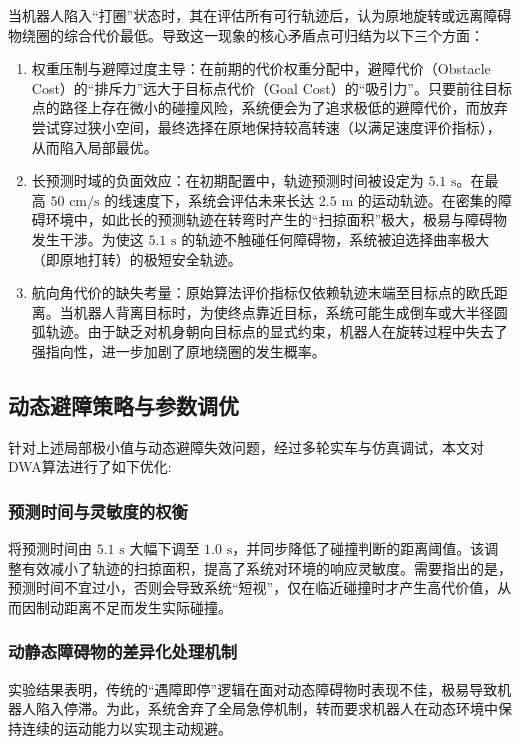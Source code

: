 \documentclass[
  oneside,
  degree=bachelor,
  fullwidthstop=false,
  fontset=fandol,
  times=false,
  minted=true,
  biblatex=true,
]{tongjithesis}
\begin{document}
当机器人陷入“打圈”状态时，其在评估所有可行轨迹后，认为原地旋转或远离障碍物绕圈的综合代价最低。导致这一现象的核心矛盾点可归结为以下三个方面：

\begin{enumerate}
    \item 权重压制与避障过度主导：在前期的代价权重分配中，避障代价（Obstacle Cost）的“排斥力”远大于目标点代价（Goal Cost）的“吸引力”。只要前往目标点的路径上存在微小的碰撞风险，系统便会为了追求极低的避障代价，而放弃尝试穿过狭小空间，最终选择在原地保持较高转速（以满足速度评价指标），从而陷入局部最优。
    
    \item 长预测时域的负面效应：在初期配置中，轨迹预测时间被设定为 $5.1\text{ s}$。在最高 $50\text{ cm/s}$ 的线速度下，系统会评估未来长达 $2.5\text{ m}$ 的运动轨迹。在密集的障碍环境中，如此长的预测轨迹在转弯时产生的“扫掠面积”极大，极易与障碍物发生干涉。为使这 $5.1\text{ s}$ 的轨迹不触碰任何障碍物，系统被迫选择曲率极大（即原地打转）的极短安全轨迹。
    
    \item 航向角代价的缺失考量：原始算法评价指标仅依赖轨迹末端至目标点的欧氏距离。当机器人背离目标时，为使终点靠近目标，系统可能生成倒车或大半径圆弧轨迹。由于缺乏对机身朝向目标点的显式约束，机器人在旋转过程中失去了强指向性，进一步加剧了原地绕圈的发生概率。
\end{enumerate}

\subsection{动态避障策略与参数调优}

针对上述局部极小值与动态避障失效问题，经过多轮实车与仿真调试，本文对DWA算法进行了如下优化:

\subsubsection{预测时间与灵敏度的权衡}
将预测时间由 $5.1\text{ s}$ 大幅下调至 $1.0\text{ s}$，并同步降低了碰撞判断的距离阈值。该调整有效减小了轨迹的扫掠面积，提高了系统对环境的响应灵敏度。需要指出的是，预测时间不宜过小，否则会导致系统“短视”，仅在临近碰撞时才产生高代价值，从而因制动距离不足而发生实际碰撞。

\subsubsection{动静态障碍物的差异化处理机制}
实验结果表明，传统的“遇障即停”逻辑在面对动态障碍物时表现不佳，极易导致机器人陷入停滞。为此，系统舍弃了全局急停机制，转而要求机器人在动态环境中保持连续的运动能力以实现主动规避。
\end{document}
